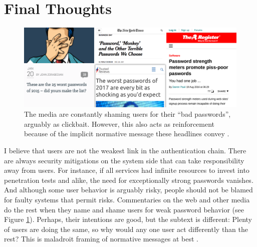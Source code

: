 

\section{Final Thoughts}
\begin{figure}
	\centering
	\includegraphics[width=\linewidth]{figures/summary/shaming-news}
	\caption{\label{fig:summary:shaming-news} The media are constantly shaming users for their ``bad passwords'', arguably as clickbait. However, this also acts as reinforcement because of the implicit normative message these headlines convey \cite{Cialdini2003CraftingNormativeMessages}. }
\end{figure}
I believe that users are not the weakest link in the authentication chain. There are always security mitigations on the system side that can take responsibility away from users. For instance, if all services had infinite resources to invest into penetration tests and alike, the need for exceptionally strong passwords vanishes. And although some user behavior is arguably risky, people should not be blamed for faulty systems that permit risks. Commentaries on the web and other media do the rest when they name and shame users for weak password behavior (see Figure \ref{fig:summary:shaming-news}). Perhaps, their intentions are good, but the subtext is different: Plenty of users are doing the same, so why would any one user act differently than the rest? This is maladroit framing of normative messages at best \cite{Cialdini2003CraftingNormativeMessages}.

